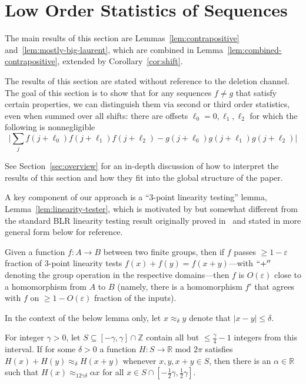 \documentclass[11pt]{article}
\theoremstyle{plain}
\renewcommand{\mod}{\text{ mod }}
\newcommand{\eps}{\varepsilon}
\begin{document}
\section{Low Order Statistics of Sequences}\label{sec:sequences}


The main results of this section are Lemmas~\ref{lem:contrapositive} and~\ref{lem:mostly-big-laurent}, which are combined in Lemma~\ref{lem:combined-contrapositive}, extended by Corollary~\ref{cor:shift}.

The results of this section are stated without reference to the deletion channel. The goal of this section is to show that for any sequences $f\neq g$ that satisfy certain properties, we can distinguish them via second or third order statistics, even when summed over all shifts: there are offsets $\ell_0=0,\ell_1,\ell_2$ for which the following is nonnegligible
\begin{equation}\label{eq:third-order-example}\Big|\sum_j f(j+\ell_0)f(j+\ell_1)f(j+\ell_2)-g(j+\ell_0)g(j+\ell_1)g(j+\ell_2)\Big|\end{equation}

See Section~\ref{sec:overview} for an in-depth discussion of how to interpret the results of this section and how they fit into the global structure of the paper.




A key component of our approach is a ``3-point linearity testing'' lemma, Lemma~\ref{lem:linearity-tester}, which is motivated by but somewhat different from the standard BLR linearity testing result originally proved in~\cite{10.1145/100216.100225} and stated in more general form below for reference.

\begin{lemma}
Given a function $f:A\rightarrow B$ between two finite groups, then if $f$ passes $\geq 1-\eps$ fraction of 3-point linearity tests $f(x)+f(y)=f(x+y)$---with $``+''$ denoting the group operation in the respective domains---then $f$ is $O(\eps)$ close to a homomorphism from $A$ to $B$ (namely, there is a homomorphism $f'$ that agrees with $f$ on $\geq 1-O(\eps)$ fraction of the inputs).
\end{lemma}


In the context of the below lemma only, let $x\approx_\delta y$ denote that $|x-y|\leq \delta$.

\begin{lemma}\label{lem:linearity-tester}
For integer $\gamma>0$, let $S\subseteq [-\gamma,\gamma]\cap\mathbb{Z}$ contain all but $\leq\frac{\gamma}{4}-1$ integers from this interval. If for some $\delta>0$ a function $H:S\rightarrow \mathbb{R}\mod 2\pi$ satisfies $H(x)+H(y)\approx_\delta H(x+y)$ whenever $x,y,x+y\in S$, then there is an $\alpha\in\mathbb{R}$ such that $H(x)\approx_{12\gamma\delta} \alpha x$ for all $x\in S\cap [-\frac{1}{2}\gamma,\frac{1}{2}\gamma]$.    
\end{lemma}
\end{document}
